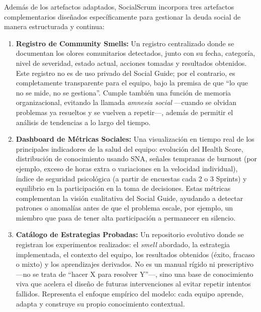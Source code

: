 Además de los artefactos adaptados, SocialScrum incorpora tres artefactos complementarios diseñados específicamente para gestionar la deuda social de manera estructurada y continua:

\begin{enumerate}
    \item \textbf{Registro de Community Smells:}
          Un registro centralizado donde se documentan los olores comunitarios detectados, junto con su fecha, categoría, nivel de severidad, estado actual, acciones tomadas y resultados obtenidos.
          Este registro no es de uso privado del Social Guide; por el contrario, es completamente transparente para el equipo, bajo la premisa de que ``lo que no se mide, no se gestiona''.
          Cumple también una función de memoria organizacional, evitando la llamada \textit{amnesia social} —cuando se olvidan problemas ya resueltos y se vuelven a repetir—, además de permitir el análisis de tendencias a lo largo del tiempo.

    \item \textbf{Dashboard de Métricas Sociales:}
          Una visualización en tiempo real de los principales indicadores de la salud del equipo: evolución del Health Score, distribución de conocimiento usando SNA, señales tempranas de burnout (por ejemplo, exceso de horas extra o variaciones en la velocidad individual), índice de seguridad psicológica (a partir de encuestas cada 2 o 3 Sprints) y equilibrio en la participación en la toma de decisiones.
          Estas métricas complementan la visión cualitativa del Social Guide, ayudando a detectar patrones o anomalías antes de que el problema escale, por ejemplo, un miembro que pasa de tener alta participación a permanecer en silencio.

    \item \textbf{Catálogo de Estrategias Probadas:}
          Un repositorio evolutivo donde se registran los experimentos realizados: el \textit{smell} abordado, la estrategia implementada, el contexto del equipo, los resultados obtenidos (éxito, fracaso o mixto) y los aprendizajes derivados.
          No es un manual rígido ni prescriptivo —no se trata de ``hacer X para resolver Y''—, sino una base de conocimiento viva que acelera el diseño de futuras intervenciones al evitar repetir intentos fallidos.
          Representa el enfoque empírico del modelo: cada equipo aprende, adapta y construye su propio conocimiento contextual.

\end{enumerate}

